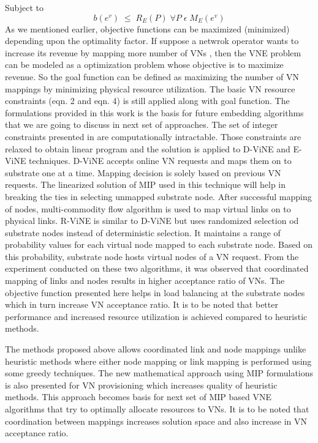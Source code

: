 \documentclass[article,dr=phil,type=msc ,colorback,accentcolor=tud4b]{tudthesis}
\begin{document}
Subject to 
\begin{equation}
b(e^{v})  \; \leq \; R_{E}(P) \;\forall P \;\epsilon \;M_{E}(e^{v})
\end{equation}
As we mentioned earlier, objective functions can be maximized (minimized) depending upon the optimality factor. If suppose a netwrok operator wants to increase its revenue by mapping more number of VNs , then the VNE problem can be modeled as a optimization problem whose objective is to maximize revenue. So the goal function can be defined as maximizing the number of VN mappings by minimizing physical resource utilization. The basic VN resource constraints (eqn. 2 and eqn. 4) is still applied along with goal function. The formulations provided in this work is the basis for future embedding algorithms that we are going to discuss in next set of approaches. The set of integer constraints presented in \cite{coord_map} are computationally intractable. Those constraints are relaxed to obtain linear program and the solution is applied to D-ViNE and E-ViNE techniques. D-ViNE accepts online VN requests and maps them on to substrate one at a time. Mapping decision is solely based on previous VN requests. The linearized solution of MIP used in this technique will help in breaking the ties in selecting unmapped substrate node. After successful mapping of nodes, multi-commodity flow algorithm is used to map virtual links on to physical links.\newline
\hspace*{1cm}R-ViNE is similar to D-ViNE but uses randomized selection od substrate nodes instead of deterministic selection. It maintains a range of probability values for each virtual node mapped to each substrate node. Based on this probability, substrate node hosts virtual nodes of a VN request. From the experiment conducted on these two algorithms, it was observed that coordinated mapping of links and nodes results in higher acceptance ratio of VNs. The objective function presented here helps in load balancing at the substrate nodes which in turn increase VN acceptance ratio. It is to be noted that better performance and increased resource utilization is achieved compared to heuristic methods.\newline

The methods proposed above allows coordinated link and node mappings unlike heuristic methods where either node mapping or link mapping is performed using some greedy techniques. The new mathematical approach using MIP formulations is also presented for VN provisioning which increases quality of heuristic methods. This approach becomes basis for next set of MIP based VNE algorithms that try to optimally allocate resources to VNs. It is to be noted that coordination between mappings increases solution space and also increase in VN acceptance ratio. \newline
\end{document}

